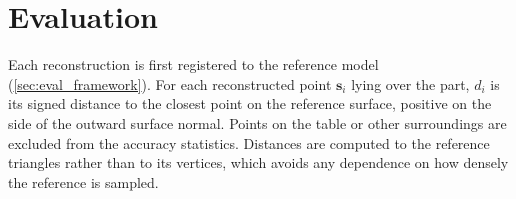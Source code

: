 \section{Evaluation}
\label{sec:theory_evaluation}
Each reconstruction is first registered to the reference model (\autoref{sec:eval_framework}).
For each reconstructed point $\mathbf{s}_i$ lying over the part, $d_i$ is its signed distance to the closest point on the reference surface, positive on the side of the outward surface normal. Points on the table or other surroundings are excluded from the accuracy statistics. Distances are computed to the reference triangles rather than to its vertices, which avoids any dependence on how densely the reference is sampled.

